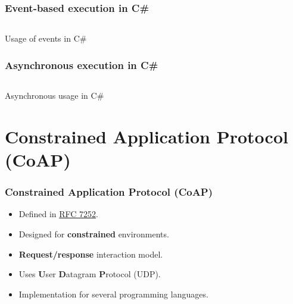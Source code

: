 \documentclass[11pt,t,usepdftitle=false,aspectratio=169,usenames,dvipsnames]{beamer}
\begin{document}
    \begin{frame}
        \frametitle{Event-based execution in C\#}
        
        \begin{listing}[H]
            \inputminted[framesep=2mm, baselinestretch=1.2, fontsize=\scriptsize, linenos]{csharp}{codes/example_eventbased.cs}
            \caption{Usage of events in C\#}
            \label{listing:usage-of-events-in-csharp}
        \end{listing}
    \end{frame}

    \begin{frame}
        \frametitle{Asynchronous execution in C\#}

        \begin{listing}[H]
            \inputminted[framesep=2mm, baselinestretch=1.2, fontsize=\scriptsize, linenos]{csharp}{codes/example_asynchronous.cs}
            \caption{Asynchronous usage in C\#}
            \label{listing:asynchronous-usage-in-csharp}
        \end{listing}
    \end{frame}

    \section{Constrained Application Protocol (CoAP)}
    \begin{frame}
        \frametitle{Constrained Application Protocol (CoAP)}
        \begin{itemize}
            \item<1-> Defined in \href{https://tools.ietf.org/html/rfc7252}{RFC 7252}.
            \item<2-> Designed for \textcolor{uibkblue}{\textbf{constrained}} environments.
            \item<3-> \textcolor{uibkblue}{\textbf{Request/response}} interaction model.
            \item<4-> Uses \textcolor{uibkblue}{\textbf{U}}ser \textcolor{uibkblue}{\textbf{D}}atagram \textcolor{uibkblue}{\textbf{P}}rotocol (UDP).
            \item<5-> Implementation for several programming languages.
        \end{itemize}
    \end{frame}
\end{document}
